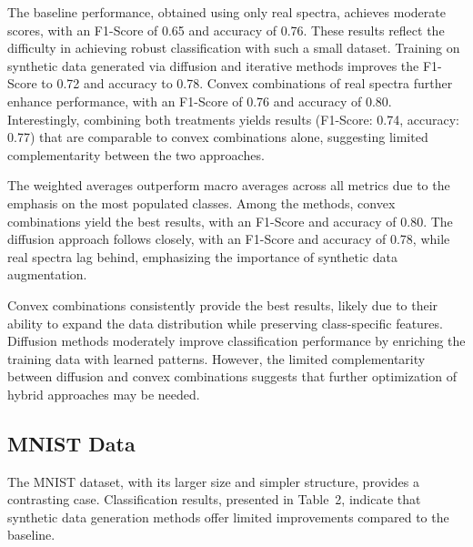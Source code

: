 \documentclass[sigconf]{acmart}
\begin{document}
The baseline performance, obtained using only real spectra, achieves moderate scores, with an F1-Score of 0.65 and accuracy of 0.76. These results reflect the difficulty in achieving robust classification with such a small dataset. Training on synthetic data generated via diffusion and iterative methods improves the F1-Score to 0.72 and accuracy to 0.78. Convex combinations of real spectra further enhance performance, with an F1-Score of 0.76 and accuracy of 0.80. Interestingly, combining both treatments yields results (F1-Score: 0.74, accuracy: 0.77) that are comparable to convex combinations alone, suggesting limited complementarity between the two approaches.

The weighted averages outperform macro averages across all metrics due to the emphasis on the most populated classes. Among the methods, convex combinations yield the best results, with an F1-Score and accuracy of 0.80. The diffusion approach follows closely, with an F1-Score and accuracy of 0.78, while real spectra lag behind, emphasizing the importance of synthetic data augmentation.

Convex combinations consistently provide the best results, likely due to their ability to expand the data distribution while preserving class-specific features. Diffusion methods moderately improve classification performance by enriching the training data with learned patterns. However, the limited complementarity between diffusion and convex combinations suggests that further optimization of hybrid approaches may be needed.

\subsection{MNIST Data}

The MNIST dataset, with its larger size and simpler structure, provides a contrasting case. Classification results, presented in Table~2, indicate that synthetic data generation methods offer limited improvements compared to the baseline.
\end{document}
